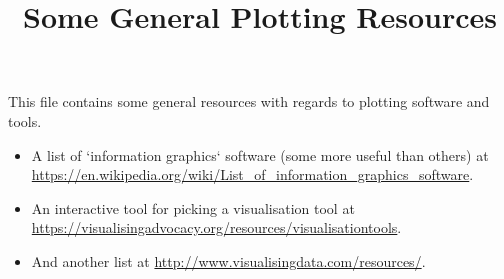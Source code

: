 \documentclass[a4paper]{article}
\title{Some General Plotting Resources}
\begin{document}
    \maketitle
    This file contains some general resources with regards to plotting software and tools.\\

    \begin{itemize}
        \item A list of `information graphics` software (some more useful than others) at \url{https://en.wikipedia.org/wiki/List_of_information_graphics_software}.\\
        \item An interactive tool for picking a visualisation tool at \url{https://visualisingadvocacy.org/resources/visualisationtools}.\\
        \item And another list at \url{http://www.visualisingdata.com/resources/}.\\
    \end{itemize}
\end{document}
